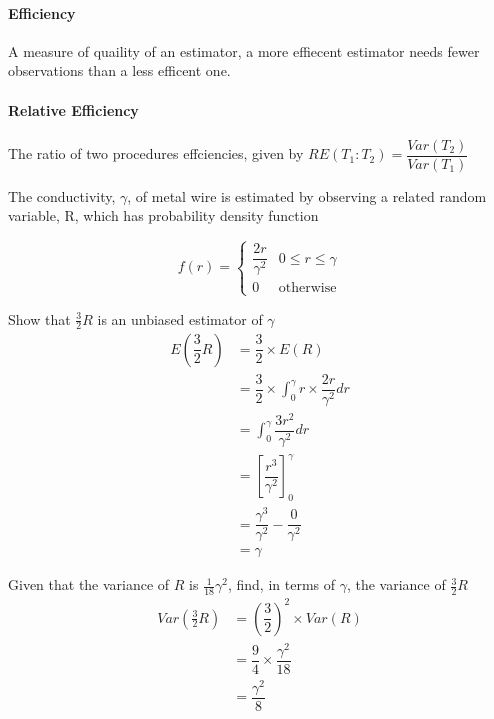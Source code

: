     \paragraph{Efficiency} A measure of quaility of an estimator, a more effiecent estimator needs fewer observations than a less efficent one.

    \paragraph{Relative Efficiency} The ratio of two procedures effciencies, given by $RE(T_1 : T_2) = \dfrac{Var(T_2)}{Var(T_1)}$

    \begin{example}
    {
        The conductivity, $\gamma$, of metal wire is estimated by observing a related random variable, R, which has probability density function

        $$
        f(r) = 
        \begin{cases}
        \dfrac{2r}{\gamma^2} & 0 \leq r \leq \gamma \\
        0 & \text{otherwise}
        \end{cases}
        $$
    }

        \begin{step}{Show that $\frac{3}{2}R$ is an unbiased estimator of $\gamma$}
            \begin{align*}
            E\left(\dfrac{3}{2}R\right) &= \dfrac{3}{2} \times E(R)                                             \\
                                        &= \dfrac{3}{2} \times \int_0^\gamma r \times \dfrac{2r}{\gamma^2} dr   \\
                                        &= \int_0^\gamma \dfrac{3r^2}{\gamma^2} dr                              \\
                                        &= \left[\dfrac{r^3}{\gamma^2}\right]^\gamma_0                          \\
                                        &= \dfrac{\gamma^3}{\gamma^2} - \dfrac{0}{\gamma^2}                     \\
                                        &= \gamma 
            \end{align*}
        \end{step}

        \begin{step}{Given that the variance of $R$ is $\frac{1}{18}\gamma^2$, find, in terms of $\gamma$, the variance of $\frac{3}{2}R$}
            \begin{align*}
            Var\left(\frac{3}{2}R\right) &= \left(\dfrac{3}{2}\right)^2 \times Var(R)   \\
                                        &= \dfrac{9}{4} \times \dfrac{\gamma^2}{18}      \\
                                        &= \dfrac{\gamma^2}{8}
            \end{align*}
        \end{step}


\end{example}
